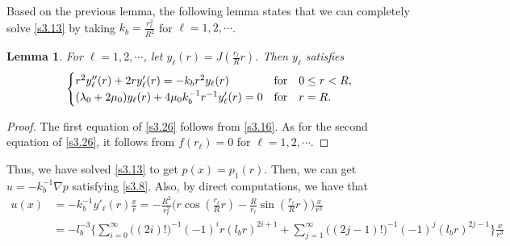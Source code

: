\documentclass[a4paper,12pt]{article}
\newtheorem{lemma}[Th]{Lemma}
\newtheorem{a priori condition}[Th]{A priori condition}
\begin{document}
\medskip\noindent
Based on the previous lemma, the following lemma states that we can completely solve \eqref{s3.13} by taking $k_b=\frac{r_\ell^2}{R^2}$ for  $\ell=1,2,\cdots$.
\begin{lemma}\label{s_lem3.4}
For $\ell=1,2,\cdots$, let $y_\ell(r)=J(\frac{r_\ell}{R}r)$. Then $y_\ell$ satisfies
\begin{equation}\label{s3.26}
\begin{array}{l}
\begin{cases}
r^2 y_\ell''(r)+2ry_\ell'(r)=-k_br^2 y_\ell(r)&\mbox{\rm for}\quad 0\leq r< R,\\
(\lambda_0+2\mu_0)y_\ell(r)+4\mu_0k_b^{-1}r^{-1}y_\ell'(r)=0     & {\rm for}\quad r=R.
\end{cases}
\end{array}
\end{equation}
\end{lemma}
\begin{proof}
The first equation of \eqref{s3.26} follows from \eqref{s3.16}. As for the second equation of \eqref{s3.26}, it follows from $f(r_\ell)=0$ for $\ell=1,2,\cdots$.
\end{proof}
Thus, we have solved \eqref{s3.13} to get $p(x)=p_1(r)$. Then, we can get $u=-k_b^{-1} \nabla p$   
satisfying \eqref{s3.8}. 
Also, by direct computations, we have that
\begin{equation}\label{s3.27}
\begin{array}{ll}
u(x)&=-k_b^{-1}  y'_\ell(r) \frac{x}{r}=-\frac{R^2}{r_\ell^2}\big(r\cos(\frac{r_\ell}{R}r)-\frac{R}{r_\ell}\sin (\frac{r_\ell}{R}r)\big)\frac{x}{r^3}\\
&=-l_b^{-3}\{\displaystyle\sum_{i=0}^\infty\big((2i)!\big)^{-1}(-1)^i r(l_b r)^{2i+1}+\displaystyle\sum_{j=1}^\infty\big((2j-1)!\big)^{-1} (-1)^j(l_br)^{2j-1}\}\frac{x}{r^3}
\end{array}
\end{equation}

\end{document}
